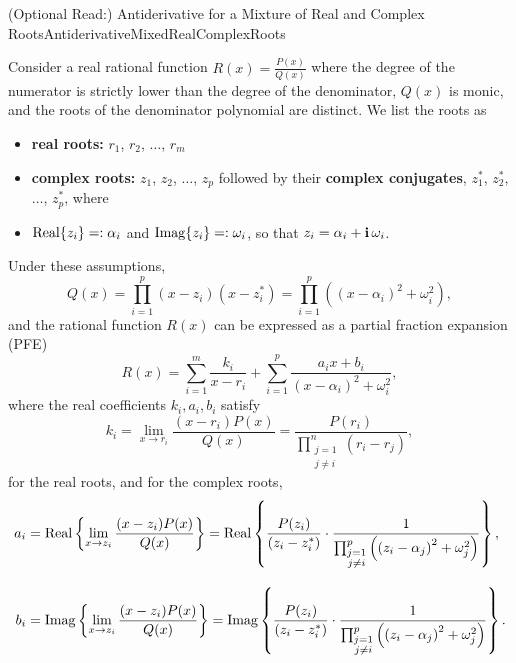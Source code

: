 \begin{propColor}{(Optional Read:) Antiderivative for a Mixture of Real and Complex Roots}{AntiderivativeMixedRealComplexRoots}

Consider a real rational function $R(x) = \frac{P(x)}{Q(x)}$ where the degree of the numerator is strictly lower than the degree of the denominator, $Q(x)$ is monic, and the roots of the denominator polynomial are distinct. We list the roots as
\begin{itemize}
    \item \textbf{real roots:} $r_1$, $r_2$, $\ldots$, $r_m$
    \item \textbf{complex roots:} $z_1$, $z_2$, $\ldots$, $z_p$ followed by their \textbf{complex conjugates}, $z_1 ^\ast$, $z_2 ^\ast$, $\ldots$, $z_p ^\ast$, where
    \item ${\rm Real}\{z_i\} =: \alpha_i$ and  ${\rm Imag}\{z_i\} =: \omega_i$, so that $z_i = \alpha_i + \mathop{\bm{\mathrm i}} \omega_i$.
\end{itemize}
Under these assumptions,
$$ Q(x) = \prod_{i=1}^p (x - z_i)(x-z_i^\ast) = \prod_{i=1}^p \left( \left(x - \alpha_i\right)^2 + \omega_i^2 \right),$$
and the rational function $R(x)$ can be expressed as a partial fraction expansion (PFE)
$$R(x) = \sum_{i=1}^m \frac{k_i}{x - r_i} + \sum_{i=1}^p \frac{a_i x + b_i}{(x - \alpha_i)^2 + \omega_i^2},$$
where the real coefficients $k_i, a_i, b_i$ satisfy
\begin{equation}
    k_i = \lim_{x \to r_i} \frac{(x-r_i) P(x)}{Q(x)} = \frac{P(r_i)}{\prod_{\substack{j=1 \\ j \neq i}}^n (r_i-r_j)},
\end{equation}
for the real roots, and for the complex roots,
\begin{equation}
\begin{aligned}
     a_i &= {\rm Real}\left\{ \lim_{x \to z_i} \frac{(x - z_i)P(x)}{Q(x)} \right\} = {\rm Real}\left\{ \frac{P(z_i)}{(z_i-z_i^\ast)}  \cdot \frac{1}{\prod_{\substack{j=1 \\ j \neq i}}^p \left( \left(z_i - \alpha_j\right)^2 + \omega_j^2 \right)}\right\}, \\[1em]
     b_i &= {\rm Imag}\left\{ \lim_{x \to z_i} \frac{(x - z_i)P(x)}{Q(x)} \right\} =  {\rm Imag}\left\{ \frac{P(z_i)}{(z_i-z_i^\ast)}  \cdot \frac{1}{\prod_{\substack{j=1 \\ j \neq i}}^p  \left( \left(z_i - \alpha_j\right)^2 + \omega_j^2 \right)}\right\}.
\end{aligned}
\end{equation}
\bigskip


\end{propColor}
